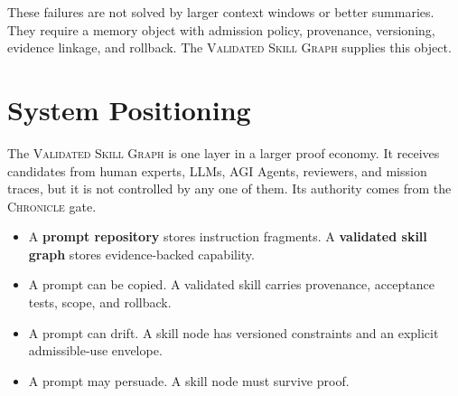 \documentclass[10.5pt,oneside]{article}
\newcommand{\vsg}{\textsc{Validated Skill Graph}}
\newcommand{\chronicle}{\textsc{Chronicle}}
\begin{document}
These failures are not solved by larger context windows or better summaries. They require a memory object with admission policy, provenance, versioning, evidence linkage, and rollback. The \vsg{} supplies this object.

\section{System Positioning}
The \vsg{} is one layer in a larger proof economy. It receives candidates from human experts, LLMs, AGI Agents, reviewers, and mission traces, but it is not controlled by any one of them. Its authority comes from the \chronicle{} gate.

\begin{itemize}
  \item A \textbf{prompt repository} stores instruction fragments. A \textbf{validated skill graph} stores evidence-backed capability.
  \item A prompt can be copied. A validated skill carries provenance, acceptance tests, scope, and rollback.
  \item A prompt can drift. A skill node has versioned constraints and an explicit admissible-use envelope.
  \item A prompt may persuade. A skill node must survive proof.
\end{itemize}
\end{document}
